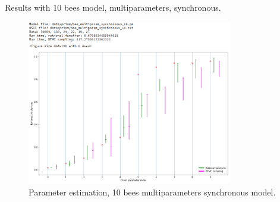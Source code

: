 \documentclass[12pt]{article}
\theoremstyle{definition}
\begin{document}
Results with 10 bees model, multiparameters, synchronous.
\begin{figure}[H]
  \centering
  \includegraphics[width=0.8\textwidth,keepaspectratio]{figures/normal_10.png}
  \caption{Parameter estimation, 10 bees multiparameters synchronous model.}
\end{figure}
\end{document}
